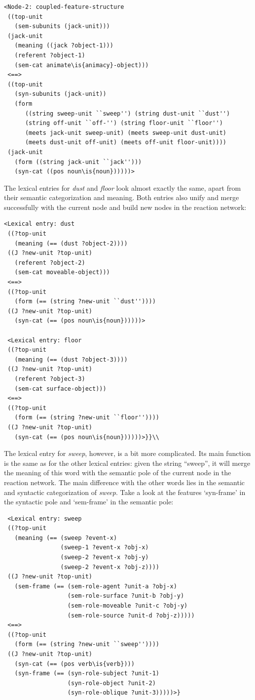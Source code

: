 \ea
\begin{lstlisting}
<Node-2: coupled-feature-structure
 ((top-unit
   (sem-subunits (jack-unit)))
 (jack-unit
   (meaning ((jack ?object-1)))
   (referent ?object-1)
   (sem-cat animate\is{animacy}-object)))
 <==>
 ((top-unit
   (syn-subunits (jack-unit))
   (form 
      ((string sweep-unit ``sweep'') (string dust-unit ``dust'') 
      (string off-unit ``off-'') (string floor-unit ``floor'') 
      (meets jack-unit sweep-unit) (meets sweep-unit dust-unit) 
      (meets dust-unit off-unit) (meets off-unit floor-unit))))
 (jack-unit
   (form ((string jack-unit ``jack'')))
   (syn-cat ((pos noun\is{noun})))))> 
\end{lstlisting}
\z

\largerpage
The lexical entries for {\em dust} and {\em floor} look almost exactly the same, apart from their semantic categorization and meaning. Both entries also unify and merge successfully with the current node and build new nodes in the reaction network: 

\ea
\begin{lstlisting}
<Lexical entry: dust
 ((?top-unit
   (meaning (== (dust ?object-2))))
 ((J ?new-unit ?top-unit)
   (referent ?object-2)
   (sem-cat moveable-object)))
 <==>
 ((?top-unit
   (form (== (string ?new-unit ``dust''))))
 ((J ?new-unit ?top-unit)
   (syn-cat (== (pos noun\is{noun})))))> 
 
 <Lexical entry: floor
 ((?top-unit
   (meaning (== (dust ?object-3))))
 ((J ?new-unit ?top-unit)
   (referent ?object-3)
   (sem-cat surface-object)))
 <==>
 ((?top-unit
   (form (== (string ?new-unit ``floor''))))
 ((J ?new-unit ?top-unit)
   (syn-cat (== (pos noun\is{noun})))))>}}\\
\end{lstlisting}
\z


The lexical entry for {\em sweep}, however, is a bit more complicated. Its main function is the same as for the other lexical entries: given the string ``sweep'', it will merge the meaning of this word with the semantic pole of the current node in the reaction network. The main difference with the other words lies in the semantic and syntactic categorization of {\em sweep}. Take a look at the features `syn-frame' in the syntactic pole and `sem-frame' in the semantic pole:


\ea
\begin{lstlisting}
 <Lexical entry: sweep
 ((?top-unit
   (meaning (== (sweep ?event-x)
                (sweep-1 ?event-x ?obj-x)
                (sweep-2 ?event-x ?obj-y)
                (sweep-2 ?event-x ?obj-z))))
 ((J ?new-unit ?top-unit)
   (sem-frame (== (sem-role-agent ?unit-a ?obj-x)
                  (sem-role-surface ?unit-b ?obj-y)
                  (sem-role-moveable ?unit-c ?obj-y)
                  (sem-role-source ?unit-d ?obj-z)))))
 <==>
 ((?top-unit
   (form (== (string ?new-unit ``sweep''))))
 ((J ?new-unit ?top-unit)
   (syn-cat (== (pos verb\is{verb})))
   (syn-frame (== (syn-role-subject ?unit-1)
                  (syn-role-object ?unit-2)
                  (syn-role-oblique ?unit-3)))))>}
\end{lstlisting}
\z


